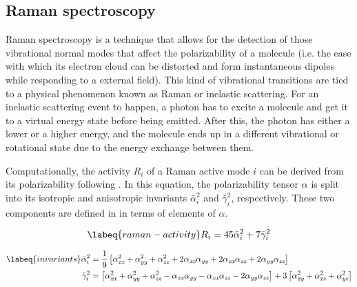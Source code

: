 \subsection{Raman spectroscopy}
Raman spectroscopy is a technique that allows for the detection of those vibrational normal modes that affect the polarizability of a molecule (i.e. the ease with which its electron cloud can be distorted and form instantaneous dipoles while responding to a external field).
This kind of vibrational transitions are tied to a physical phenomenon known as Raman or inelastic scattering.
For an inelastic scattering event to happen, a photon has to excite a molecule and get it to a virtual energy state before being emitted.
After this, the photon has either a lower or a higher energy, and the molecule ends up in a different vibrational or rotational state due to the energy exchange between them.

Computationally, the activity $R_i$ of a Raman active mode $i$ can be derived from its polarizability following .
In this equation, the polarizability tensor $\alpha$ is split into its isotropic and anisotropic invariants $\bar{\alpha}_i^2$ and $\bar{\gamma}_i^2$, respectively.
These two components are defined in  in terms of elements of $\alpha$.

\begin{equation}
    \labeq{raman-activity}
    R_i = 45\bar{\alpha}_i^2 + 7\bar{\gamma}_i^2
\end{equation}

\begin{align}
\begin{split}
    \labeq{invariants}
    \bar{\alpha}_i^2 &= \frac{1}{9}\left[\alpha_\textit{xx}^2 +
                                         \alpha_\textit{yy}^2 +
                                         \alpha_\textit{zz}^2 +
                                         2\alpha_\textit{xx}\alpha_\textit{yy} + 2\alpha_\textit{xx}\alpha_\textit{zz} +
                                         2\alpha_\textit{yy}\alpha_\textit{zz}
                                         \right] \\
    \bar{\gamma}_i^2 &= \left[\alpha_\textit{xx}^2 +
                              \alpha_\textit{yy}^2 +
                              \alpha_\textit{zz}^2 -
                              \alpha_\textit{xx}\alpha_\textit{yy} - \alpha_\textit{xx}\alpha_\textit{zz} -
                              2\alpha_\textit{yy}\alpha_\textit{zz}
                              \right]
                       + 3 \left[\alpha_\textit{xy}^2 +
                                 \alpha_\textit{xz}^2 +
                                 \alpha_\textit{yz}^2
                                 \right] \\
\end{split}
\end{align}

